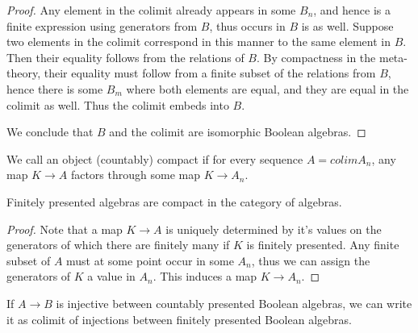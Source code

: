 \begin{proof}
  Any element in the colimit already appears in some $B_n$, and hence is 
  a finite expression using generators from $B$, thus occurs in $B$ is as well. 
  Suppose two elements in the colimit correspond in this manner to the same element in $B$. 
  Then their equality follows from the relations of $B$. 
  By compactness in the meta-theory, their equality must follow from a finite subset of the relations from $B$, 
  hence there is some $B_m$ where both elements are equal, and they are equal in the colimit as well. 
  Thus the colimit embeds into $B$. 

  We conclude that $B$ and the colimit are isomorphic Boolean algebras. 
\end{proof} 









\begin{definition}
  We call an object (countably) compact if for every sequence $A = colim A_n$, any map $K \to A$ 
  factors through some map $K \to A_n$. 
\end{definition}

\begin{lemma}
  Finitely presented algebras are compact in the category of algebras. 
\end{lemma}  
\begin{proof}
  Note that a map $K \to A$ is uniquely determined by it's values on the generators
  of which there are finitely many if $K$ is finitely presented. 
  Any finite subset of $A$ must at some point occur in some $A_n$, 
  thus we can assign the generators of $K$ a value in $A_n$. 
  This induces a map $K \to A_n$. 
\end{proof}



\begin{lemma}
  If $A \to B$ is injective between countably presented Boolean algebras, 
  we can write it as colimit of injections between finitely presented Boolean algebras. 
\end{lemma}
